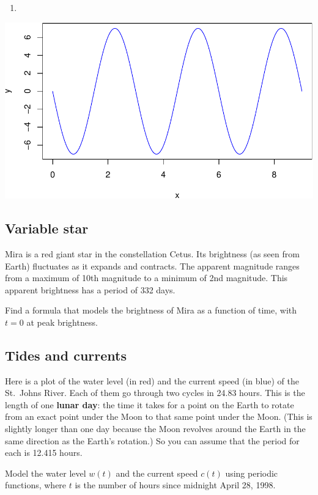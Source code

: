 \documentclass[
]{book}
\begin{document}
\begin{enumerate}
\def\labelenumi{\arabic{enumi}.}
\setcounter{enumi}{1}
\item
\end{enumerate}

\includegraphics[width=0.75\linewidth]{_bookdown_files/math135_handbook_files/figure-latex/periodic1-1}

\hypertarget{variable-star}{%
\subsection{Variable star}\label{variable-star}}

Mira is a red giant star in the constellation Cetus. Its brightness (as seen from Earth) fluctuates as it expands and contracts. The apparent magnitude ranges from a maximum of 10th magnitude to a minimum of 2nd magnitude. This apparent brightness has a period of 332 days.

Find a formula that models the brightness of Mira as a function of time, with \(t=0\) at peak brightness.

\hypertarget{tides-and-currents}{%
\subsection{Tides and currents}\label{tides-and-currents}}

Here is a plot of the water level (in red) and the current speed (in blue) of the St.~Johns River. Each of them go through two cycles in 24.83 hours. This is the length of one \textbf{lunar day}: the time it takes for a point on the Earth to rotate from an exact point under the Moon to that same point under the Moon. (This is slightly longer than one day because the Moon revolves around the Earth in the same direction as the Earth's rotation.) So you can assume that the period for each is 12.415 hours.

Model the water level \(w(t)\) and the current speed \(c(t)\) using periodic functions, where \(t\) is the number of hours since midnight April 28, 1998.
\end{document}
